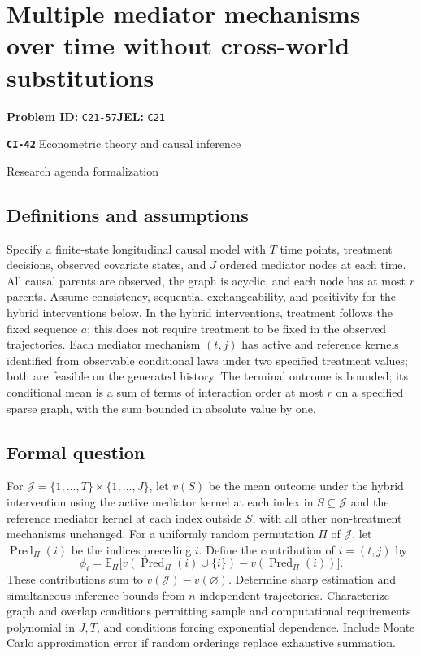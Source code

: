 \documentclass[11pt,a4paper]{article}
\newcommand{\E}{\mathbb E}
\newcommand{\entrymeta}[3]{{\sffamily\small\color{muted}\textbf{\texttt{#1}}\quad|\quad #2\par #3\par}}
\begin{document}
\section*{Multiple mediator mechanisms over time without cross-world substitutions}
\textbf{Problem ID:} \texttt{C21-57}\quad \textbf{JEL:} \texttt{C21}\par
\label{problem:OP-0521}
\label{beyond:CI-42}
\entrymeta{CI-42}{Econometric theory and causal inference}{Research agenda formalization}
\subsection*{Definitions and assumptions}
Specify a finite-state longitudinal causal model with $T$ time points, treatment decisions, observed covariate states, and $J$ ordered mediator nodes at each time. All causal parents are observed, the graph is acyclic, and each node has at most $r$ parents. Assume consistency, sequential exchangeability, and positivity for the hybrid interventions below. In the hybrid interventions, treatment follows the fixed sequence $a$; this does not require treatment to be fixed in the observed trajectories. Each mediator mechanism $(t,j)$ has active and reference kernels identified from observable conditional laws under two specified treatment values; both are feasible on the generated history. The terminal outcome is bounded; its conditional mean is a sum of terms of interaction order at most $r$ on a specified sparse graph, with the sum bounded in absolute value by one.
\subsection*{Formal question}
For $\mathcal J=\{1,\ldots,T\}\times\{1,\ldots,J\}$, let $v(S)$ be the mean outcome under the hybrid intervention using the active mediator kernel at each index in $S\subseteq\mathcal J$ and the reference mediator kernel at each index outside $S$, with all other non-treatment mechanisms unchanged. For a uniformly random permutation $\Pi$ of $\mathcal J$, let $\operatorname{Pred}_{\Pi}(i)$ be the indices preceding $i$. Define the contribution of $i=(t,j)$ by
\[
 \phi_i=\E_{\Pi}\bigl[v(\operatorname{Pred}_{\Pi}(i)\cup\{i\})-v(\operatorname{Pred}_{\Pi}(i))\bigr].
\] These contributions sum to $v(\mathcal J)-v(\varnothing)$. Determine sharp estimation and simultaneous-inference bounds from $n$ independent trajectories. Characterize graph and overlap conditions permitting sample and computational requirements polynomial in $J,T$, and conditions forcing exponential dependence. Include Monte Carlo approximation error if random orderings replace exhaustive summation.
\end{document}
